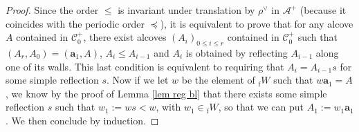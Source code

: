\documentclass[11pt]{amsart}
\theoremstyle{plain}
\theoremstyle{remark}
\numberwithin{equation}{section}
\begin{document}
	\begin{proof}
	 Since the order $\leq$ is invariant under translation by $\rho^\vee$ in $\mathcal{A}^+$ (because it coincides with the periodic order $\preceq$), it is equivalent to prove that for any alcove $A$ contained in $\mathscr{C}^+_0$, there exist alcoves $(A_i)_{0\leq i\leq r}$ contained in $\mathscr{C}^+_0$ such that $(A_r,A_0)=(\mathbf{a}_1,A)$, $A_{i}\leq A_{i-1}$ and $A_i$ is obtained by reflecting $A_{i-1}$ along one of its walls. This last condition is equivalent to requiring that $A_i=A_{i-1}s$ for some simple reflection $s$. Now if we let $w$ be the element of ${_\mathrm{f}W}$ such that $w\mathbf{a}_1=A$, we know by the proof of Lemma \ref{lem reg bl} that there exists some simple reflection $s$ such that $w_1:=ws<w$, with $w_1\in {_\mathrm{f}W}$, so that we can put $A_1:=w_1\mathbf{a}_1$. We then conclude by induction.
	\end{proof}
	
\end{document}

